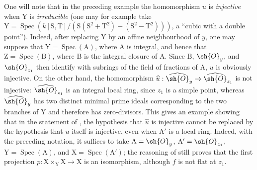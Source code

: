 \begin{env}[11.7.4]
\label{IV.11.7.4}
One will note that in the preceding example the homomorphism $u$ is \emph{injective} when $\mathrm{Y}$ is \emph{irreducible} (one may for example take $\mathrm{Y}=\operatorname{Spec}(k[\mathrm{S},\mathrm{T}]/(\mathrm{S}(\mathrm{S}^2+\mathrm{T}^2)-(\mathrm{S}^2-\mathrm{T}^2)))$, a ``cubic with a double point''). Indeed, after replacing $\mathrm{Y}$ by an affine neighbourhood of $y$, one may suppose that $\mathrm{Y}=\operatorname{Spec}(\mathrm{A})$, where $\mathrm{A}$ is integral, and hence that $\mathrm{Z}=\operatorname{Spec}(\mathrm{B})$, where $\mathrm{B}$ is the integral closure of $\mathrm{A}$. Since $\mathrm{B}$, $\sh{O}_y$, and $\sh{O}_{z_1}$ then identify with subrings of
the field of fractions of $\mathrm{A}$, $u$ is obviously injective.
On the other hand, the homomorphism $\widehat{u}:\widehat{\sh{O}}_y\to\widehat{\sh{O}}_{z_1}$ is not injective: $\widehat{\sh{O}}_{z_1}$ is an integral local ring, since $z_1$ is a simple point, whereas $\widehat{\sh{O}}_y$ has two distinct minimal prime ideals corresponding to the two branches of $\mathrm{Y}$ and therefore has zero-divisors.
This gives an example showing that in the statement of , the hypothesis that $\widehat{u}$ is injective cannot be replaced by the hypothesis that $u$ itself is injective, even when $\mathrm{A}'$ is a local ring.
Indeed, with the preceding notation, it suffices to take $\mathrm{A}=\sh{O}_y$, $\mathrm{A}'=\sh{O}_{z_1}$, $\mathrm{Y}=\operatorname{Spec}(\mathrm{A})$, and $\mathrm{X}=\operatorname{Spec}(\mathrm{A}')$; the reasoning of  still proves that the first projection $p:\mathrm{X}\times_\mathrm{Y}\mathrm{X}\to\mathrm{X}$ is an isomorphism, although $f$ is not flat at $z_1$.
\end{env}

